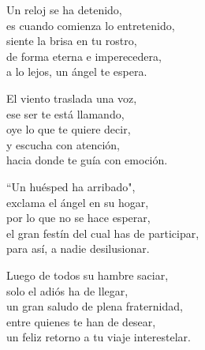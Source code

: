 \begin{center}
\vspace{1em}
Un reloj se ha detenido,\\
es cuando comienza lo entretenido,\\
siente la brisa en tu rostro,\\
de forma eterna e imperecedera,\\
a lo lejos, un ángel te espera.

\vspace{1em}
El viento traslada una voz,\\
ese ser te está llamando,\\
oye lo que te quiere decir,\\
y escucha con atención,\\
hacia donde te guía con emoción.

\vspace{1em}
``Un huésped ha arribado",\\
exclama el ángel en su hogar,\\
por lo que no se hace esperar,\\
el gran festín del cual has de participar,\\
para así, a nadie desilusionar.

\vspace{1em}
Luego de todos su hambre saciar,\\
solo el adiós ha de llegar,\\
un gran saludo de plena fraternidad,\\
entre quienes te han de desear,\\
un feliz retorno a tu viaje interestelar.


\end{center}




